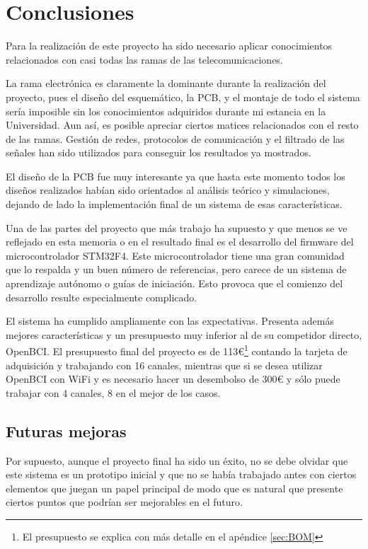\chapter{Conclusiones\label{sec:conclusiones}}

Para la realización de este proyecto ha sido necesario aplicar conocimientos relacionados con casi todas las ramas de las telecomunicaciones.

La rama electrónica es claramente la dominante durante la realización del proyecto, pues el diseño del esquemático, la \acrshort{PCB}, y el montaje de todo el sistema sería imposible sin los conocimientos adquiridos durante mi estancia en la Universidad. Aun así, es posible apreciar ciertos matices relacionados con el resto de las ramas. Gestión de redes, protocolos de comunicación y el filtrado de las señales han sido utilizados para conseguir los resultados ya mostrados.

El diseño de la \acrshort{PCB} fue muy interesante ya que hasta este momento todos los diseños realizados habían sido orientados al análisis teórico y simulaciones, dejando de lado la implementación final de un sistema de esas características.

Una de las partes del proyecto que más trabajo ha supuesto y que menos se ve reflejado en esta memoria o en el resultado final es el desarrollo del firmware del microcontrolador STM32F4. Este microcontrolador tiene una gran comunidad que lo respalda y un buen número de referencias, pero carece de un sistema de aprendizaje autónomo o guías de iniciación. Esto provoca que el comienzo del desarrollo resulte especialmente complicado.

El sistema ha cumplido ampliamente con las expectativas. Presenta además mejores características y un presupuesto muy inferior al de su competidor directo, OpenBCI. El presupuesto final del proyecto es de 113€\footnote{El presupuesto se explica con más detalle en el apéndice \ref{sec:BOM}} contando la tarjeta de adquisición y trabajando con 16 canales, mientras que si se desea utilizar OpenBCI con WiFi y es necesario hacer un desembolso de 300€ y sólo puede trabajar con 4 canales, 8 en el mejor de los casos.

\section{Futuras mejoras}

Por supuesto, aunque el proyecto final ha sido un éxito, no se debe olvidar que este sistema es un prototipo inicial y que no se había trabajado antes con ciertos elementos que juegan un papel principal de modo que es natural que presente ciertos puntos que podrían ser mejorables en el futuro.

